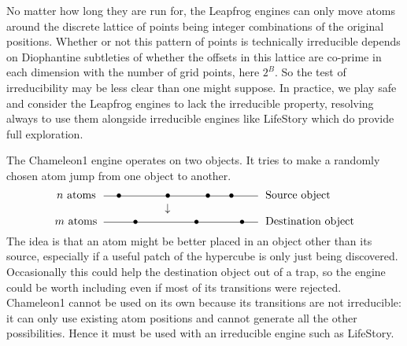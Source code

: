 No matter how long they are run for,
the Leapfrog engines can only move atoms around the discrete lattice of points being integer combinations of the original positions.
Whether or not this pattern of points is technically irreducible depends on Diophantine subtleties of 
whether the offsets in this lattice are co-prime in each dimension with the number of grid points, here $2^B$.
So the test of irreducibility may be less clear than one might suppose.
In practice, we play safe and consider the Leapfrog engines to lack the irreducible property, 
resolving always to use them alongside irreducible engines like LifeStory which do provide full exploration. 

\bigskip
{}
\smallskip

The Chameleon1 engine operates on two objects.
It tries to make a randomly chosen atom jump from one object to another.
$$
\vbox{\hbox{$\,n$ atoms}
      \hbox{\ }
      \hbox{$m$ atoms}
     }
\hskip 6pt
\vbox{\hbox{{\raise2pt\hbox to 140pt{\hrulefill}} \hskip -132pt $\bullet$ \hskip 36pt $\bullet$ \hskip 28pt $\bullet$ \hskip 13pt $\bullet$ \hskip 19pt}
      \hbox{\hskip 55.5pt $\downarrow$}
      \hbox{{\raise2pt\hbox to 140pt{\hrulefill}} \hskip -117pt $\bullet$ \hskip 21pt \hskip 8pt \hskip 18pt $\bullet$ \hskip 33pt $\bullet$ \hskip 9pt}
     }
\hskip 6pt
\vbox{\hbox{Source object}
      \hbox{\ }
      \hbox{Destination object}
     }
$$
The idea is that an atom might be better placed in an object other than its source, especially if a useful patch of the hypercube is only just being discovered.
Occasionally this could help the destination object out of a trap, so the engine could be worth including even if most of its transitions were rejected.
Chameleon1 cannot be used on its own because its transitions are not irreducible: 
it can only use existing atom positions and cannot generate all the other possibilities.
Hence it must be used with an irreducible engine such as LifeStory.

